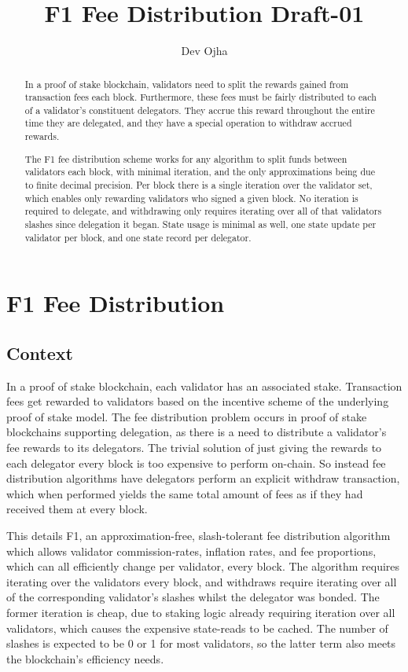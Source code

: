 \documentclass[]{article}
\title{F1 Fee Distribution Draft-01}
\author{Dev Ojha}
\begin{document}
\maketitle

\begin{abstract}
	In a proof of stake blockchain, validators need to split the rewards gained from transaction fees each block. Furthermore, these fees must be fairly distributed to each of a validator's constituent delegators. They accrue this reward throughout the entire time they are delegated, and they have a special operation to withdraw accrued rewards.
	
	The F1 fee distribution scheme works for any algorithm to split funds between validators each block, with minimal iteration, and the only approximations being due to finite decimal precision. Per block there is a single iteration over the validator set, which enables only rewarding validators who signed a given block. No iteration is required to delegate, and withdrawing only requires iterating over all of that validators slashes since delegation it began. State usage is minimal as well, one state update per validator per block, and one state record per delegator.
\end{abstract}

\section{F1 Fee Distribution}

\subsection{Context}
In a proof of stake blockchain, each validator has an associated stake.
Transaction fees get rewarded to validators based on the incentive scheme of the underlying proof of stake model.
The fee distribution problem occurs in proof of stake blockchains supporting delegation, as there is a need to distribute a validator's fee rewards to its delegators.
The trivial solution of just giving the rewards to each delegator every block is too expensive to perform on-chain.
So instead fee distribution algorithms have delegators perform an explicit withdraw transaction, which when performed yields the same total amount of fees as if they had received them at every block. 

This details F1, an approximation-free, slash-tolerant fee distribution algorithm which allows validator commission-rates, inflation rates, and fee proportions, which can all efficiently change per validator, every block.
The algorithm requires iterating over the validators every block, and withdraws require iterating over all of the corresponding validator's slashes whilst the delegator was bonded.
The former iteration is cheap, due to staking logic already requiring iteration over all validators, which causes the expensive state-reads to be cached.
The number of slashes is expected to be 0 or 1 for most validators,
so the latter term also meets the blockchain's efficiency needs.
\end{document}
